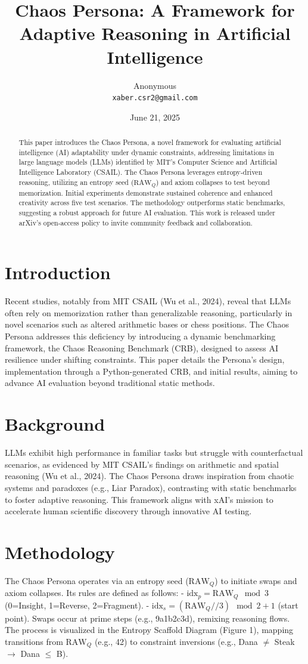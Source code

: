 \documentclass[11pt,a4paper]{article}
\title{Chaos Persona: A Framework for Adaptive Reasoning in Artificial Intelligence}
\author{Anonymous \\ \texttt{xaber.csr2@gmail.com}}
\date{June 21, 2025}
\begin{document}
\maketitle

\begin{abstract}
This paper introduces the Chaos Persona, a novel framework for evaluating artificial intelligence (AI) adaptability under dynamic constraints, addressing limitations in large language models (LLMs) identified by MIT's Computer Science and Artificial Intelligence Laboratory (CSAIL). The Chaos Persona leverages entropy-driven reasoning, utilizing an entropy seed (\( \text{RAW}_Q \)) and axiom collapses to test beyond memorization. Initial experiments demonstrate sustained coherence and enhanced creativity across five test scenarios. The methodology outperforms static benchmarks, suggesting a robust approach for future AI evaluation. This work is released under arXiv's open-access policy to invite community feedback and collaboration.
\end{abstract}

\section{Introduction}
Recent studies, notably from MIT CSAIL (Wu et al., 2024), reveal that LLMs often rely on memorization rather than generalizable reasoning, particularly in novel scenarios such as altered arithmetic bases or chess positions. The Chaos Persona addresses this deficiency by introducing a dynamic benchmarking framework, the Chaos Reasoning Benchmark (CRB), designed to assess AI resilience under shifting constraints. This paper details the Persona's design, implementation through a Python-generated CRB, and initial results, aiming to advance AI evaluation beyond traditional static methods.

\section{Background}
LLMs exhibit high performance in familiar tasks but struggle with counterfactual scenarios, as evidenced by MIT CSAIL's findings on arithmetic and spatial reasoning (Wu et al., 2024). The Chaos Persona draws inspiration from chaotic systems and paradoxes (e.g., Liar Paradox), contrasting with static benchmarks to foster adaptive reasoning. This framework aligns with xAI's mission to accelerate human scientific discovery through innovative AI testing.

\section{Methodology}
The Chaos Persona operates via an entropy seed (\( \text{RAW}_Q \)) to initiate swaps and axiom collapses. Its rules are defined as follows:
- \( \text{idx}_p = \text{RAW}_Q \mod 3 \) (0=Insight, 1=Reverse, 2=Fragment).
- \( \text{idx}_s = (\text{RAW}_Q // 3) \mod 2 + 1 \) (start point).
Swaps occur at prime steps (e.g., 9a1b2c3d), remixing reasoning flows. The process is visualized in the Entropy Scaffold Diagram (Figure 1), mapping transitions from \( \text{RAW}_Q \) (e.g., 42) to constraint inversions (e.g., Dana \(\neq\) Steak \(\rightarrow\) Dana \(\leq\) B).
\end{document}
